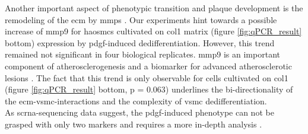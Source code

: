 Another important aspect of phenotypic transition and plaque development is the remodeling of the \ac{ecm} by \acp{mmp} \cite{johnsonMetalloproteinasesAtherosclerosis2017}.
Our experiments hint towards a possible increase of \ac{mmp9} for \acp{haosmc} cultivated on \ac{col1} matrix (figure \ref{fig:qPCR_result} bottom) expression by \ac{pdgf}-induced dedifferentiation. However, this trend remained not significant in four biological replicates. \ac{mmp9} is an important component of atherosclerogenesis \cite{galisIncreasedExpressionMatrix1994} and a biomarker for advanced atherosclerotic lesions \cite{langleyExtracellularMatrixProteomics2017}. The fact that this trend is only observable for cells cultivated on \ac{col1} (figure \ref{fig:qPCR_result} bottom, p = 0.063) underlines the bi-directionality of the \ac{ecm}-\ac{vsmc}-interactions and the complexity of \ac{vsmc} dedifferentiation.\\
As \ac{sc}\ac{rna}-sequencing data suggest, the \ac{pdgf}-induced phenotype can not be grasped with only two markers and requires a more in-depth analysis \cite{}.



